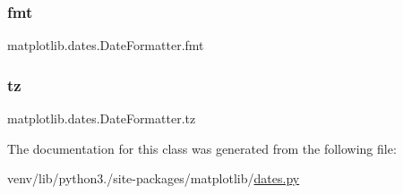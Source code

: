 \subsubsection{\texorpdfstring{fmt}{fmt}}
{\footnotesize\ttfamily matplotlib.\+dates.\+Date\+Formatter.\+fmt}

\mbox{\label{classmatplotlib_1_1dates_1_1DateFormatter_a339b6db1db974758187da8c3f98319c7}} 
\subsubsection{\texorpdfstring{tz}{tz}}
{\footnotesize\ttfamily matplotlib.\+dates.\+Date\+Formatter.\+tz}



The documentation for this class was generated from the following file\+:\begin{DoxyCompactItemize}
\item 
venv/lib/python3./site-\/packages/matplotlib/\hyperlink{dates_8py}{dates.\+py}\end{DoxyCompactItemize}
